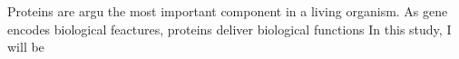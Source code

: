 Proteins are argu the most important component in a living organism. As gene encodes biological feactures, proteins deliver biological functions   In this study, I will be 